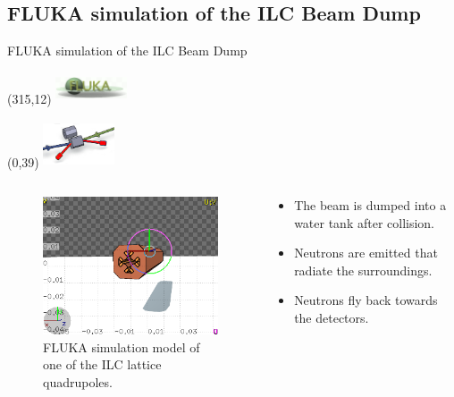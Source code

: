 \documentclass[xcolor={dvipsnames}]{beamer}
\newcommand{\flukalogo}{
  \setlength{\TPHorizModule}{1pt}
  \setlength{\TPVertModule}{1pt}
  \begin{textblock}{1}(315,12)
   \includegraphics[width=60pt,height=26pt]{figures/fluka_logo.png}
  \end{textblock}
}
\newcommand{\EXTsymbol}{
  \setlength{\TPHorizModule}{1pt}
  \setlength{\TPVertModule}{1pt}
  \begin{textblock}{1}(0,39)
   \includegraphics[width=60pt,height=40pt]{figures/Highlight_EXT.png}
  \end{textblock}
}
\begin{document}
\subsection{FLUKA simulation of the ILC Beam Dump}
\begin{frame}{FLUKA simulation of the ILC Beam Dump}
\flukalogo
\EXTsymbol
\begin{columns}[T]
\begin{column}[b]{0.4\textwidth}
 \begin{figure}
 \centering
\includegraphics[height=0.45\textheight]{figures/FLUKA_quadrupole_model.png}
\caption{\small FLUKA simulation model of one of the ILC lattice quadrupoles.}
\end{figure}
\end{column}
\begin{column}[b]{0.6\textwidth}
\begin{itemize}
 \item The beam is dumped into a water tank after collision.
 \item Neutrons are emitted that radiate the surroundings.
 \item Neutrons fly back towards the detectors.
\end{itemize}
\vspace*{0.5cm}
\end{column}
\end{columns}
\end{frame}
\end{document}
